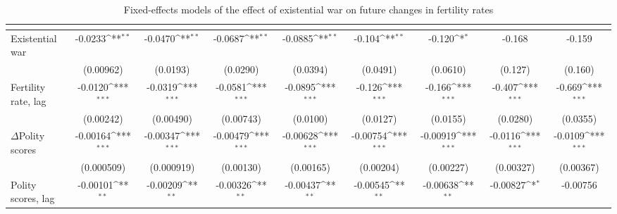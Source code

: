 \begin{table}[htbp]\centering
\def\sym#1{\ifmmode^{#1}\else\(^{#1}\)\fi}
\caption{Fixed-effects models of the effect of existential war on future changes in fertility rates\label{fefertilityexistential}}
\begin{tabular}{l*{8}{c}}
\hline\hline
                    &&&&&&&&\\
\hline
Existential war    &     -0.0233\sym{**} &     -0.0470\sym{**} &     -0.0687\sym{**} &     -0.0885\sym{**} &      -0.104\sym{**} &      -0.120\sym{*}  &      -0.168         &      -0.159         \\
                    &   (0.00962)         &    (0.0193)         &    (0.0290)         &    (0.0394)         &    (0.0491)         &    (0.0610)         &     (0.127)         &     (0.160)         \\
[1em]
Fertility rate, lag      &     -0.0120\sym{***}&     -0.0319\sym{***}&     -0.0581\sym{***}&     -0.0895\sym{***}&      -0.126\sym{***}&      -0.166\sym{***}&      -0.407\sym{***}&      -0.669\sym{***}\\
                    &   (0.00242)         &   (0.00490)         &   (0.00743)         &    (0.0100)         &    (0.0127)         &    (0.0155)         &    (0.0280)         &    (0.0355)         \\
[1em]
$\Delta$Polity scores          &    -0.00164\sym{***}&    -0.00347\sym{***}&    -0.00479\sym{***}&    -0.00628\sym{***}&    -0.00754\sym{***}&    -0.00919\sym{***}&     -0.0116\sym{***}&     -0.0109\sym{***}\\
                    &  (0.000509)         &  (0.000919)         &   (0.00130)         &   (0.00165)         &   (0.00204)         &   (0.00227)         &   (0.00327)         &   (0.00367)         \\
[1em]
Polity scores, lag          &    -0.00101\sym{**} &    -0.00209\sym{**} &    -0.00326\sym{**} &    -0.00437\sym{**} &    -0.00545\sym{**} &    -0.00638\sym{**} &    -0.00827\sym{*}  &    -0.00756         \\

\end{tabular}
\end{table}
